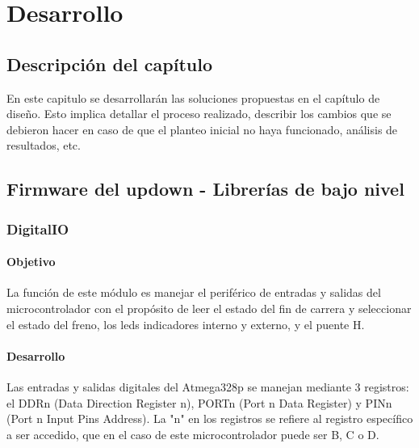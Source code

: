 \chapter{Desarrollo}
\thispagestyle{empty}

\section{Descripción del capítulo} \label{sec:\thesection}
En este capitulo se desarrollarán las soluciones propuestas en el capítulo de diseño. Esto implica detallar el proceso realizado, describir los cambios que se debieron hacer en caso de que el planteo inicial no haya funcionado, análisis de resultados, etc.

\section{Firmware del updown - Librerías de bajo nivel} \label{sec:\thesection}

\subsection{DigitalIO}
\subsubsection{Objetivo}
La función de este módulo es manejar el periférico de entradas y salidas del microcontrolador con el propósito de leer el estado del fin de carrera y seleccionar el estado del freno, los leds indicadores interno y externo, y el puente H.

\subsubsection{Desarrollo}
Las entradas y salidas digitales del Atmega328p se manejan mediante 3 registros: el DDRn (Data Direction Register n), PORTn (Port n Data Register) y PINn (Port n Input Pins Address). La "n" en los registros se refiere al registro específico a ser accedido, que en el caso de este microcontrolador puede ser B, C o D.

